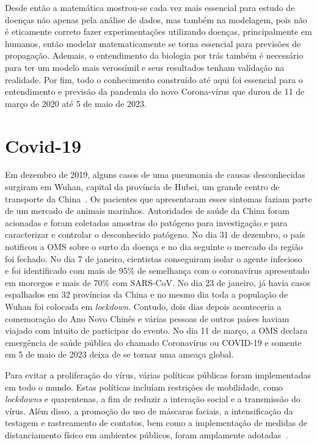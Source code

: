 Desde então a matemática mostrou-se cada vez mais essencial para estudo de doenças não apenas pela análise de dados, mas também na modelagem, pois não é eticamente correto fazer experimentações utilizando doenças, principalmente em humanos, então modelar matematicamente se torna essencial para previsões de propagação. Ademais, o entendimento da biologia por trás também é necessário para ter um modelo mais verossímil e seus resultados tenham 
validação na realidade.
Por fim, todo o conhecimento construído até aqui foi essencial para o entendimento e previsão da pandemia do novo Corona-vírus que durou de 11 de março de 2020 até 5 de maio de 2023.

\section{Covid-19}

Em dezembro de 2019, alguns casos de uma pneumonia de causas desconhecidas surgiram em Wuhan, capital da província de Hubei, um grande centro de transporte da China~\cite{Singhal2020}. 
Os pacientes que apresentaram esses sintomas faziam parte de um mercado de animais marinhos. Autoridades de saúde da China foram acionadas e foram coletadas amostras do patógeno para investigação 
e 
para caracterizar e controlar o desconhecido patógeno. No dia 31 de dezembro, o país notificou a OMS sobre o surto da doença e no dia seguinte o mercado da região foi fechado. No dia 7 de janeiro, cientistas conseguiram isolar o agente infecioso~\cite{Wang2020} e foi identificado com mais de 95\% de semelhança com o coronavírus apresentado em morcegos e mais de 70\% com SARS-CoV. No dia 23 de janeiro, já havia casos espalhados em 32 províncias da China e no mesmo dia toda a população de Wuhan foi colocada em \textit{lockdown}. Contudo, dois dias depois aconteceria a comemoração do Ano Novo Chinês e várias pessoas de outros países haviam viajado com intuito de participar do evento. No dia 11 de março, a OMS declara emergência de saúde pública do chamado Coronavírus ou COVID-19 e somente em
5 de maio de 2023 deixa de se tornar uma ameaça global.

Para evitar a proliferação do vírus, várias políticas públicas 
foram implementadas em todo o mundo. Estas políticas incluíam restrições de mobilidade, como \textit{lockdowns} e quarentenas, a fim de reduzir a interação social e a transmissão do vírus. Além disso, a promoção do uso de máscaras faciais, a intensificação da testagem e rastreamento de contatos, bem como a implementação de medidas de distanciamento físico em ambientes públicos, foram amplamente adotadas~\cite{PalaciosCruz2021}. 

